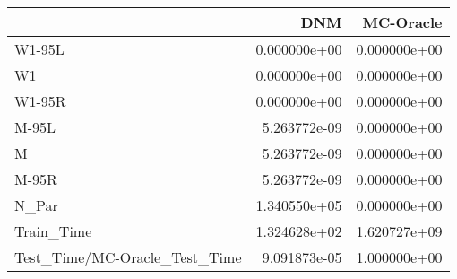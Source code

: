\begin{tabular}{lrr}
\toprule
{} &           DNM &     MC-Oracle \\
\midrule
W1-95L                        &  0.000000e+00 &  0.000000e+00 \\
W1                            &  0.000000e+00 &  0.000000e+00 \\
W1-95R                        &  0.000000e+00 &  0.000000e+00 \\
M-95L                         &  5.263772e-09 &  0.000000e+00 \\
M                             &  5.263772e-09 &  0.000000e+00 \\
M-95R                         &  5.263772e-09 &  0.000000e+00 \\
N\_Par                         &  1.340550e+05 &  0.000000e+00 \\
Train\_Time                    &  1.324628e+02 &  1.620727e+09 \\
Test\_Time/MC-Oracle\_Test\_Time &  9.091873e-05 &  1.000000e+00 \\
\bottomrule
\end{tabular}
